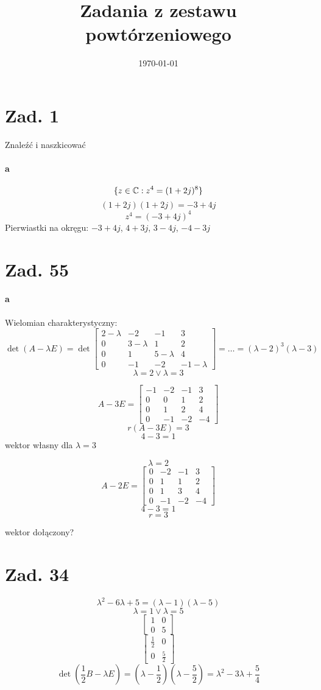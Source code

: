 \documentclass[a4paper,fleqn]{article}
\title{Zadania z zestawu powtórzeniowego}
\author{}
\date{\today}
\begin{document}
	\section*{Zad. 1}
	Znaleźć i naszkicować
	\paragraph{a}
	\[ \{ z\in\mathbb{C} : z^4 = (1+2j)^8 \} \]
	\[ (1+2j)(1+2j) = -3 + 4j \]
	\[ z^4 = (-3+4j)^4 \]
	Pierwiastki na okręgu: $-3+4j$, $4+3j$, $3-4j$, $-4-3j$
	\section*{Zad. 55}
	\paragraph{a}
	Wielomian charakterystyczny:
	\[ \det(A-\lambda E) = \det \begin{bmatrix}
		2-\lambda & -2 & -1 & 3\\
		0 & 3-\lambda & 1 &2 \\
		0&1 & 5-\lambda & 4 \\
		0 & -1 & -2 &  -1-\lambda
		\end{bmatrix} = \ldots = (\lambda-2)^3 (\lambda-3) \]
	\[ \lambda =2 \lor \lambda = 3 \]

	\[ A-3E = \begin{bmatrix}
		-1 & -2 & -1 & 3 \\
		0&0&1&2\\
		0&1&2&4\\
		0&-1&-2&-4
		\end{bmatrix} \]
	\[ r(A-3E) = 3 \]
	\[ 4-3 = 1 \]
	wektor własny dla $\lambda = 3 $

	\[ \lambda = 2 \]
	\[ A-2E = \begin{bmatrix}
		0 & -2 & -1 & 3 \\
		0& 1 & 1 & 2 \\
		0 & 1 & 3 & 4 \\
		0 & -1 & -2 & -4
		\end{bmatrix}
		\]
	\[ 4 -3 = 1 \]
	\[ r = 3 \]

	wektor dołączony?

	\section*{Zad. 34}
	\[ \lambda^2 - 6\lambda + 5 = (\lambda-1)(\lambda-5) \]
	\[ \lambda = 1 \lor \lambda = 5 \]
	\[ \begin{bmatrix} 1& 0\\ 0& 5 \end{bmatrix} \]
	\[ \begin{bmatrix} \frac 1 2 & 0 \\ 0 & \frac 5 2 \end{bmatrix} \]
	\[ \det(\frac 1 2 B -\lambda E) = (\lambda-\frac 1 2)(\lambda-\frac 5 2) =
		 \lambda^2 - 3\lambda + \frac 5 4 \]
\end{document}
